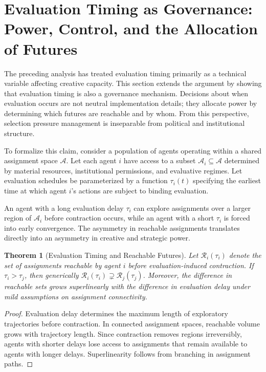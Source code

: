 \documentclass[11pt]{article}
\newtheorem{theorem}{Theorem}
\theoremstyle{definition}
\begin{document}
\section{Evaluation Timing as Governance: Power, Control, and the Allocation of Futures}

The preceding analysis has treated evaluation timing primarily as a technical variable affecting creative capacity. This section extends the argument by showing that evaluation timing is also a governance mechanism. Decisions about when evaluation occurs are not neutral implementation details; they allocate power by determining which futures are reachable and by whom. From this perspective, selection pressure management is inseparable from political and institutional structure.

To formalize this claim, consider a population of agents operating within a shared assignment space $\mathcal{A}$. Let each agent $i$ have access to a subset $\mathcal{A}_i \subseteq \mathcal{A}$ determined by material resources, institutional permissions, and evaluative regimes. Let evaluation schedules be parameterized by a function $\tau_i(t)$ specifying the earliest time at which agent $i$'s actions are subject to binding evaluation.

An agent with a long evaluation delay $\tau_i$ can explore assignments over a larger region of $\mathcal{A}_i$ before contraction occurs, while an agent with a short $\tau_i$ is forced into early convergence. The asymmetry in reachable assignments translates directly into an asymmetry in creative and strategic power.

\begin{theorem}[Evaluation Timing and Reachable Futures]
Let $\mathcal{R}_i(\tau_i)$ denote the set of assignments reachable by agent $i$ before evaluation-induced contraction. If $\tau_i > \tau_j$, then generically $\mathcal{R}_i(\tau_i) \supsetneq \mathcal{R}_j(\tau_j)$. Moreover, the difference in reachable sets grows superlinearly with the difference in evaluation delay under mild assumptions on assignment connectivity.
\end{theorem}

\begin{proof}
Evaluation delay determines the maximum length of exploratory trajectories before contraction. In connected assignment spaces, reachable volume grows with trajectory length. Since contraction removes regions irreversibly, agents with shorter delays lose access to assignments that remain available to agents with longer delays. Superlinearity follows from branching in assignment paths.
\end{proof}
\end{document}
